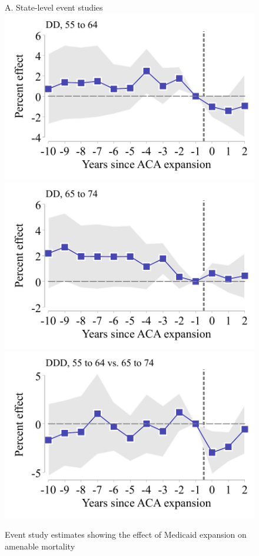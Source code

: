 \documentclass[12pt]{article}%
\begin{document}
\begin{figure}
\caption{Event study estimates showing the effect of Medicaid expansion on amenable mortality}
  \begin{minipage}[b]{0.45\linewidth}
   A. State-level event studies \\
  \centering
  \includegraphics[width=\textwidth]{../output/figures/state_event_study_55_64_ln_amenable_attpop.pdf}
  \includegraphics[width=\textwidth]{../output/figures/state_event_study_65_74_ln_amenable_attpop.pdf}
  \includegraphics[width=\textwidth]{../output/figures/state_event_study_ddd_ln_amenable_attpop.pdf}

\end{minipage}
\end{figure}
\end{document}
